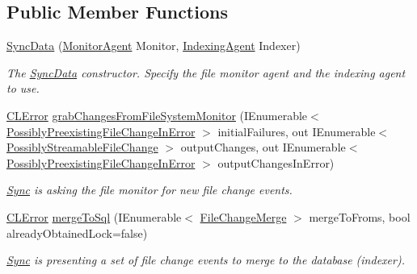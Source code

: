 \subsection*{Public Member Functions}
\begin{DoxyCompactItemize}
\item 
\hyperlink{class_cloud_api_public_1_1_file_monitor_1_1_sync_implementation_1_1_sync_data_af0b43d9edc92deb302643771046efbcd}{Sync\-Data} (\hyperlink{class_cloud_api_public_1_1_file_monitor_1_1_monitor_agent}{Monitor\-Agent} Monitor, \hyperlink{class_cloud_api_public_1_1_s_q_l_indexer_1_1_indexing_agent}{Indexing\-Agent} Indexer)
\begin{DoxyCompactList}\small\item\em The \hyperlink{class_cloud_api_public_1_1_file_monitor_1_1_sync_implementation_1_1_sync_data}{Sync\-Data} constructor. Specify the file monitor agent and the indexing agent to use. \end{DoxyCompactList}\item 
\hyperlink{class_cloud_api_public_1_1_model_1_1_c_l_error}{C\-L\-Error} \hyperlink{class_cloud_api_public_1_1_file_monitor_1_1_sync_implementation_1_1_sync_data_a0def21aaaf2d09e5697011105632437f}{grab\-Changes\-From\-File\-System\-Monitor} (I\-Enumerable$<$ \hyperlink{struct_cloud_api_public_1_1_model_1_1_possibly_preexisting_file_change_in_error}{Possibly\-Preexisting\-File\-Change\-In\-Error} $>$ initial\-Failures, out I\-Enumerable$<$ \hyperlink{struct_cloud_api_public_1_1_model_1_1_possibly_streamable_file_change}{Possibly\-Streamable\-File\-Change} $>$ output\-Changes, out I\-Enumerable$<$ \hyperlink{struct_cloud_api_public_1_1_model_1_1_possibly_preexisting_file_change_in_error}{Possibly\-Preexisting\-File\-Change\-In\-Error} $>$ output\-Changes\-In\-Error)
\begin{DoxyCompactList}\small\item\em \hyperlink{namespace_cloud_api_public_1_1_sync}{Sync} is asking the file monitor for new file change events. \end{DoxyCompactList}\item 
\hyperlink{class_cloud_api_public_1_1_model_1_1_c_l_error}{C\-L\-Error} \hyperlink{class_cloud_api_public_1_1_file_monitor_1_1_sync_implementation_1_1_sync_data_a6521a7c3fa76af5fd3566c8f0f066390}{merge\-To\-Sql} (I\-Enumerable$<$ \hyperlink{struct_cloud_api_public_1_1_model_1_1_file_change_merge}{File\-Change\-Merge} $>$ merge\-To\-Froms, bool already\-Obtained\-Lock=false)
\begin{DoxyCompactList}\small\item\em \hyperlink{namespace_cloud_api_public_1_1_sync}{Sync} is presenting a set of file change events to merge to the database (indexer). \end{DoxyCompactList}\item 

\end{DoxyCompactItemize}
